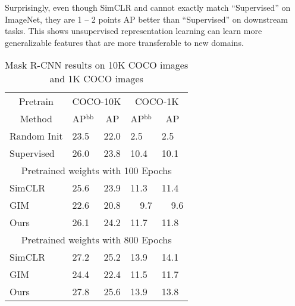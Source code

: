 Surprisingly, even though SimCLR and \ours{} cannot exactly match ``Supervised'' on ImageNet, they
are 1 -- 2 points AP better than ``Supervised'' on downstream tasks. This shows unsupervised
representation learning can learn more generalizable features that are more transferable to new
domains.

\iflatexml
\begin{table}
\begin{tabular}{l|ll|ll}
     \toprule
     \multicolumn{1}{c|}{Pretrain} & \multicolumn{2}{c|}{COCO-10K} & \multicolumn{2}{c}{COCO-1K} \\
     \multicolumn{1}{c|}{Method} & \multicolumn{1}{c}{AP$^\text{bb}$} & \multicolumn{1}{c|}{AP} & \multicolumn{1}{c}{AP$^\text{bb}$} & \multicolumn{1}{c}{AP} \\
     \midrule
     Random Init    & 23.5 & 22.0 & 2.5 & 2.5 \\
     Supervised          & 26.0 & 23.8 & 10.4 & 10.1 \\
     \midrule
     \multicolumn{5}{c}{Pretrained weights with 100 Epochs}\\
     \midrule
     SimCLR         & 25.6 & 23.9 & 11.3 & 11.4 \\
     GIM            & 22.6  \color{red}{(-3.0)} & 20.8  \color{red}{(-3.1)} & \ \  9.7  \color{red}{(-1.6)} & \ \  9.6  \color{red}{(-1.8)} \\
     Ours           & 26.1  \color{black}{(+0.3)} & 24.2  \color{black}{(+0.5)} & 11.7  \color{black}{(+0.4)}& 11.8  \color{black}{(+0.4)} \\
     \midrule
     \multicolumn{5}{c}{Pretrained weights with 800 Epochs}\\
     \midrule
     SimCLR         & 27.2 & 25.2 & 13.9 & 14.1 \\
     GIM            & 24.4 \color{red}{(-2.8)} & 22.4 \color{red}{(-2.8)} & 11.5 \color{red}{(-2.4)} & 11.7 \color{red}{(-2.4)}\\
     Ours           & 27.8 \color{black}{(+0.6)} & 25.6 \color{black}{(+0.4)} & 13.9 \color{black}{(+0.0)} & 13.8 \color{black}{(-0.3)} \\
     \bottomrule
\end{tabular}
\caption{Mask R-CNN results on 10K COCO images and 1K COCO images}
\label{tab:semi_det_results}

\end{table}
\else


